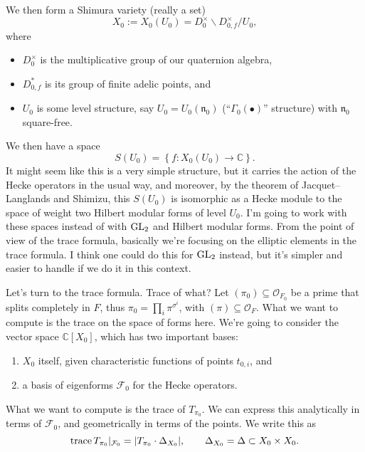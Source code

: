 \documentclass[reqno]{amsart} 
\begin{document}
We then form a Shimura variety (really a set)
\begin{equation*}
  X_0 := X_0(U_0) =
  D_0^\times \backslash D_{0, f}^\times  / U_0,
\end{equation*}
where
\begin{itemize}
\item $D_0^\times$ is the multiplicative group of our quaternion algebra,
\item $D_{0, f}^\ast$ is its group of finite adelic points, and
\item $U_0$ is some level structure, say $U_0 = U_0(\mathfrak{n}_0)$ (``$\Gamma_0(\bullet)$'' structure) with $\mathfrak{n}_0$ square-free.
\end{itemize}
We then have a space
\begin{equation*}
  S(U_0) = \left\{ f : X_0(U_0) \rightarrow \mathbb{C}  \right\}. 
\end{equation*}
It might seem like this is a very simple structure, but it carries the action of the Hecke operators in the usual way, and moreover, by the theorem of Jacquet--Langlands and Shimizu, this $S(U_0)$ is isomorphic as a Hecke module to the space of weight two Hilbert modular forms of level $U_0$.  I'm going to work with these spaces instead of with $\operatorname{GL}_2$ and Hilbert modular forms.  From the point of view of the trace formula, basically we're focusing on the elliptic elements in the trace formula.  I think one could do this for $\operatorname{GL}_2$ instead, but it's simpler and easier to handle if we do it in this context.

Let's turn to the trace formula.  Trace of what?  Let $(\pi_0) \subseteq \mathcal{O}_{F_0}$ be a prime that splits completely in $F$, thus $\pi_0 = \prod_i \pi^{\sigma^i}$, with $(\pi) \subseteq \mathcal{O}_F$.  What we want to compute is the trace on the space of forms here.  We're going to consider the vector space $\mathbb{C}[X_0]$, which has two important bases:
\begin{enumerate}
\item\label{enumerate:cnpp1no6c8} $X_0$ itself, given characteristic functions of points $t_{0, i}$, and
\item\label{enumerate:cnpp1npes7} a basis of eigenforms $\mathcal{F}_0$ for the Hecke operators.
\end{enumerate}
What we want to compute is the trace of $T_{\pi_0}$.  We can express this analytically in terms of $\mathcal{F}_0$, and geometrically in terms of the points.  We write this as
\begin{equation*}
  \operatorname{trace} T_{\pi_0} |_{\mathcal{F}_0}
  = \lvert T_{\pi_0} \cdot \Delta_{X_0} \rvert,
  \qquad
  \Delta_{X_0} = \Delta \subset X_0 \times X_0.
\end{equation*}
\end{document}
